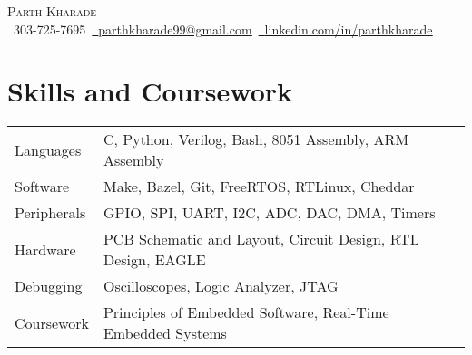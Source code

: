 \documentclass[11pt]{article}
\begin{document}
\setlength{\footskip}{4pt}
\begin{center}
  {\huge \scshape Parth Kharade} \\ \vspace{1pt}
  \small \raisebox{-0.1\height}\faPhone\ 303-725-7695{\hspace{0.1cm}}~\href{mailto:parthkharade99@gmail.com}{\raisebox{-0.2\height}\faEnvelope\ \underline{parthkharade99@gmail.com}}~{\hspace{0.1cm}}\href{https://www.linkedin.com/in/parth-k-081287184/}{\raisebox{-0.2\height}\faLinkedin\ \underline{linkedin.com/in/parthkharade}}
  \vspace{-10pt}
\end{center}



\section{Skills and Coursework}
\vspace{-4mm}
\begin{table}[!htb]
  \begin{tabular} { m{3.1cm} | m{15cm} }
    {Languages}           & {\: C, Python, Verilog, Bash, 8051 Assembly, ARM Assembly}  \\
    {Software}            & {\: Make, Bazel, Git, FreeRTOS, RTLinux, Cheddar}     \\
    {Peripherals}         & {\: GPIO, SPI, UART, I2C, ADC, DAC, DMA, Timers}                 \\
    {Hardware}            & {\: PCB Schematic and Layout, Circuit Design, RTL Design, EAGLE}\\
    {Debugging}           & {\: Oscilloscopes, Logic Analyzer, JTAG}\\
    {Coursework}          & {\: Principles of Embedded Software, Real-Time Embedded Systems}                \\
  \end{tabular}
\end{table}
\vspace{-16pt}
\end{document}
